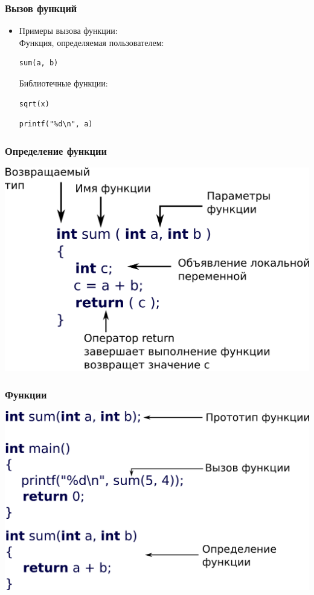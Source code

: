 \documentclass[14pt,pdf,hyperref={unicode}]{beamer}
\begin{document}
\begin{frame}[fragile]
\frametitle{Вызов функций} 
\begin{itemize}
\item Примеры вызова функции:\\
Функция, определяемая пользователем:\\
\begin{lstlisting}
sum(a, b)
\end{lstlisting}
Библиотечные функции:\\
\begin{lstlisting}
sqrt(x)
\end{lstlisting}
\begin{lstlisting}
printf("%d\n", a)
\end{lstlisting}
\end{itemize}
\end{frame}



\begin{frame}[fragile]
\frametitle{Определение функции} 
\begin{center}
\includegraphics[width=0.8\linewidth]{images/function_syntax.png}
\end{center}
\end{frame}

\begin{frame}[fragile]
\frametitle{Функции} 
\begin{center}
\includegraphics[width=0.8\linewidth]{images/function_summary.png}
\end{center}
\end{frame}
\end{document}
